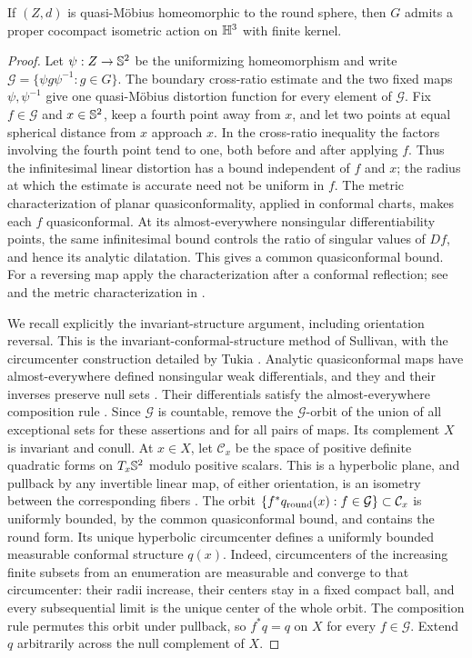\begin{proposition}
\label{prop:action}
If $(Z,d)$ is quasi-M\"obius homeomorphic to the round sphere,
then $G$ admits a proper cocompact isometric action on $\mathbb H^3$
with finite kernel.
\end{proposition}
\begin{proof}
Let $\psi:Z\to\mathbb S^2$ be the uniformizing homeomorphism and write
$\mathcal G=\{\psi g\psi^{-1}:g\in G\}$. The boundary cross-ratio estimate
and the two fixed maps $\psi,\psi^{-1}$ give one quasi-M\"obius distortion
function for every element of $\mathcal G$. Fix $f\in\mathcal G$ and $x\in\mathbb S^2$,
keep a fourth point away from $x$, and let two points at equal spherical
distance from $x$ approach $x$. In the cross-ratio inequality the factors
involving the fourth point tend to one, both before and after applying
$f$. Thus the infinitesimal linear distortion has a bound independent
of $f$ and $x$; the radius at which the estimate is accurate need not
be uniform in $f$. The metric characterization of planar
quasiconformality, applied in conformal charts, makes each $f$
quasiconformal. At its almost-everywhere nonsingular differentiability
points, the same infinitesimal bound controls the ratio of singular values
of $Df$, and hence its analytic dilatation. This gives a common
quasiconformal bound. For a reversing map apply the characterization
after a conformal reflection; see \cite[Theorems 2.5.3--2.5.4]{AIM}
and the metric characterization in \cite[Theorem 1.4 and Remark 1.8(b)]{HK}.

We recall explicitly the invariant-structure argument, including
orientation reversal. This is the invariant-conformal-structure method of
Sullivan, with the circumcenter construction detailed by Tukia
\cite[pp.~73--76]{Tukia}. Analytic quasiconformal maps have
almost-everywhere defined nonsingular weak differentials, and they and
their inverses preserve null sets \cite[Theorem 3.1.2]{AIM}.
Their differentials satisfy the almost-everywhere composition rule
\cite[Lemma 10 and Theorem 5]{AhlforsBers}.
Since $\mathcal G$ is countable, remove the $\mathcal G$-orbit
of the union of all exceptional sets for these assertions and for all
pairs of maps. Its complement $X$ is invariant and conull. At $x\in X$,
let $\mathcal C_x$ be the space of positive definite quadratic forms on
$T_x\mathbb S^2$ modulo positive scalars. This is a hyperbolic plane, and
pullback by any invertible linear map, of either orientation, is an
isometry between the corresponding fibers
\cite[Section 2.3, equations (2.17)--(2.18) and Theorem 2.3.2]{AIM}. The orbit
$\{f^*q_{\rm round}(x):f\in\mathcal G\}\subset\mathcal C_x$ is uniformly
bounded, by the common quasiconformal bound, and contains the round
form. Its unique hyperbolic circumcenter defines a uniformly bounded
measurable conformal structure $q(x)$. Indeed, circumcenters of the
increasing finite subsets from an enumeration are measurable and
converge to that circumcenter: their radii increase, their centers stay
in a fixed compact ball, and every subsequential limit is the unique
center of the whole orbit. The composition rule permutes this orbit
under pullback, so $f^*q=q$ on $X$ for every $f\in\mathcal G$. Extend $q$
arbitrarily across the null complement of $X$.


\end{proof}
